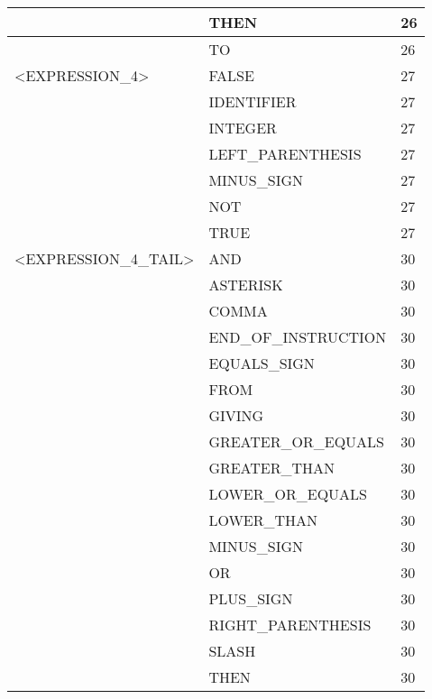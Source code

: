 \begin{longtable}{|l|l|l|}
                     &   THEN                 &   26 \\ \hline
                     &   TO                   &   26 \\ \hline
<EXPRESSION\_4>      &   FALSE                &   27 \\ \hline
                     &   IDENTIFIER           &   27 \\ \hline
                     &   INTEGER              &   27 \\ \hline
                     &   LEFT\_PARENTHESIS     &   27 \\ \hline
                     &   MINUS\_SIGN           &   27 \\ \hline
                     &   NOT                  &   27 \\ \hline
                     &   TRUE                 &   27 \\ \hline
<EXPRESSION\_4\_TAIL>&   AND                  &   30 \\ \hline
                     &   ASTERISK             &   30 \\ \hline
                     &   COMMA                &   30 \\ \hline
                     &   END\_OF\_INSTRUCTION   &   30 \\ \hline
                     &   EQUALS\_SIGN          &   30 \\ \hline
                     &   FROM                 &   30 \\ \hline
                     &   GIVING               &   30 \\ \hline
                     &   GREATER\_OR\_EQUALS    &   30 \\ \hline
                     &   GREATER\_THAN         &   30 \\ \hline
                     &   LOWER\_OR\_EQUALS      &   30 \\ \hline
                     &   LOWER\_THAN           &   30 \\ \hline
                     &   MINUS\_SIGN           &   30 \\ \hline
                     &   OR                   &   30 \\ \hline
                     &   PLUS\_SIGN            &   30 \\ \hline
                     &   RIGHT\_PARENTHESIS    &   30 \\ \hline
                     &   SLASH                &   30 \\ \hline
                     &   THEN                 &   30 \\ \hline

\end{longtable}
